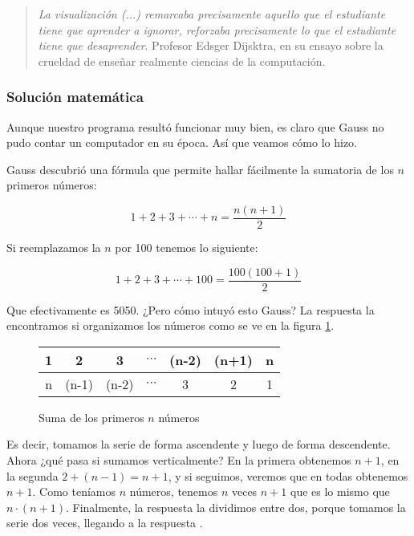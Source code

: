 \begin{quote}
\emph{La visualización (...) remarcaba precisamente aquello que el estudiante tiene que aprender a ignorar, reforzaba precisamente lo que el estudiante tiene que desaprender}.
Profesor Edsger Dijsktra, en su ensayo sobre la crueldad de enseñar realmente ciencias de la computación.
\end{quote}

\subsubsection{Solución matemática}

Aunque nuestro programa resultó funcionar muy bien, es claro que Gauss no pudo contar un computador en su época. Así que veamos cómo lo hizo.

Gauss descubrió una fórmula que permite hallar fácilmente la sumatoria de los $n$ primeros números:

\begin{equation}
1+2+3+\cdots+n = \frac{n(n+1)}{2}
\end{equation}

Si reemplazamos la $n$ por 100 tenemos lo siguiente:

\begin{equation}
1+2+3+\cdots+100 = \frac{100(100+1)}{2}
\end{equation}

Que efectivamente es 5050. ¿Pero cómo intuyó esto Gauss? La respuesta la encontramos si organizamos los números como se ve en la figura \ref{figgauss}.

\begin{figure}[h!]
\centering
\begin{tabular}{| c | c | c | c | c | c | c |}
\hline
1 & 2 & 3 & $\cdots$ & (n-2) & (n+1) & n \\ \hline
n & (n-1) & (n-2) & $\cdots$ & 3 & 2 & 1 \\ \hline
\end{tabular}
\caption{Suma de los primeros $n$ números}
\label{figgauss}
\end{figure}

Es decir, tomamos la serie de forma ascendente y luego de forma descendente. Ahora ¿qué pasa si sumamos verticalmente? En la primera obtenemos $n+1$, en la segunda $2+(n-1)=n+1$, y si seguimos, veremos que en todas obtenemos $n+1$. Como teníamos $n$ números, tenemos $n$ veces $n+1$ que es lo mismo que $n \cdot (n+1)$. Finalmente, la respuesta la dividimos entre dos, porque tomamos la serie dos veces, llegando a la respuesta \cite{graham1994concrete}.


